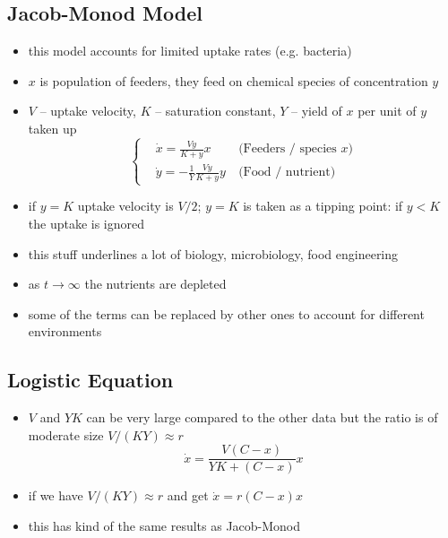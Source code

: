 \documentclass[a4paper,reqno,11pt]{article}
\begin{document}
\subsection{Jacob-Monod Model}

\begin{itemize}
    \item this model accounts for limited uptake rates (e.g. bacteria)
    \item $x$ is population of feeders, they feed on chemical species of
        concentration $y$
    \item $V$ -- uptake velocity, $K$ -- saturation constant, $Y$ -- yield of
        $x$ per unit of $y$ taken up
        \begin{equation}\nonumber
            \left\{
            \begin{aligned}
                &\dot x = \frac{Vy}{K+y}x \ &\text{(Feeders / species $x$)}\\
                &\dot y = -\frac{1}{Y}\frac{Vy}{K+y}y \ 
                            &\text{(Food / nutrient)}
            \end{aligned}
            \right.
        \end{equation}
    \item if $y = K$ uptake velocity is $V/2$; $y=K$ is taken as a tipping
        point: if $y < K$ the uptake is ignored
    \item this stuff underlines a lot of biology, microbiology, food
        engineering
    \item as $t \rightarrow \infty$ the nutrients are depleted
    \item some of the terms can be replaced by other ones to account for
        different environments
\end{itemize}

\subsection{Logistic Equation}

\begin{itemize}
    \item $V$ and $YK$ can be very large compared to the other data but the
        ratio is of moderate size $V/(KY) \approx r$
        \begin{equation}\nonumber
            \dot x = \frac{V(C-x)}{YK+(C-x)}x
        \end{equation}
    \item if we have $V/(KY) \approx r$ and get $\dot x = r (C-x)x$
    \item this has kind of the same results as Jacob-Monod
\end{itemize}
\end{document}

